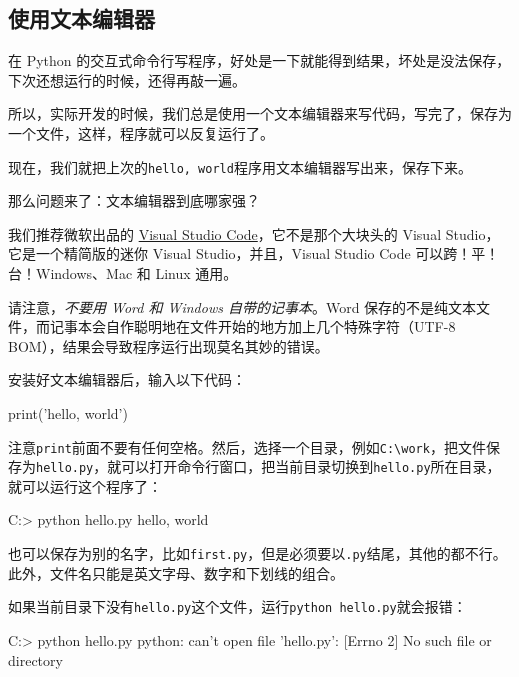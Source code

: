 \hypertarget{ux4f7fux7528ux6587ux672cux7f16ux8f91ux5668}{%
\subsection{使用文本编辑器}\label{ux4f7fux7528ux6587ux672cux7f16ux8f91ux5668}}

在 Python
的交互式命令行写程序，好处是一下就能得到结果，坏处是没法保存，下次还想运行的时候，还得再敲一遍。

所以，实际开发的时候，我们总是使用一个文本编辑器来写代码，写完了，保存为一个文件，这样，程序就可以反复运行了。

现在，我们就把上次的\texttt{\textquotesingle{}hello,\ world\textquotesingle{}}程序用文本编辑器写出来，保存下来。

那么问题来了：文本编辑器到底哪家强？

我们推荐微软出品的 \href{https://code.visualstudio.com/}{Visual Studio
Code}，它不是那个大块头的 Visual Studio，它是一个精简版的迷你 Visual
Studio，并且，Visual Studio Code 可以跨！平！台！Windows、Mac 和 Linux
通用。

请注意，\emph{不要用 Word 和 Windows 自带的记事本}。Word
保存的不是纯文本文件，而记事本会自作聪明地在文件开始的地方加上几个特殊字符（UTF-8
BOM），结果会导致程序运行出现莫名其妙的错误。

安装好文本编辑器后，输入以下代码：

\begin{pythoncode}
print('hello, world')
\end{pythoncode}

注意\texttt{print}前面不要有任何空格。然后，选择一个目录，例如\texttt{C:\textbackslash{}work}，把文件保存为\texttt{hello.py}，就可以打开命令行窗口，把当前目录切换到\texttt{hello.py}所在目录，就可以运行这个程序了：

\begin{pythoncode}
C:\work> python hello.py
hello, world
\end{pythoncode}

也可以保存为别的名字，比如\texttt{first.py}，但是必须要以\texttt{.py}结尾，其他的都不行。此外，文件名只能是英文字母、数字和下划线的组合。

如果当前目录下没有\texttt{hello.py}这个文件，运行\texttt{python\ hello.py}就会报错：

\begin{pythoncode}
C:\Users\IEUser> python hello.py
python: can't open file 'hello.py': [Errno 2] No such file or directory
\end{pythoncode}

